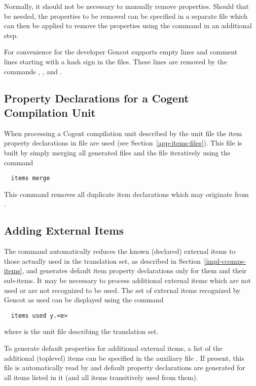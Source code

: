 Normally, it should not be necessary to manually remove properties. Should that be needed, the properties to be removed can
be specified in a separate file which can then be applied to remove the properties using the command  in 
an additional step.

For convenience for the developer Gencot supports empty lines and comment lines starting with a hash sign \code{\#} in the 
 files. These lines are removed by the commands , , and .

\subsection{Property Declarations for a Cogent Compilation Unit}
\label{app-items-unit}

When processing a Cogent compilation unit described by the unit file  the item property declarations in file
 are used (see Section~\ref{app-items-files}). This file is built by simply merging all
generated files  and the file  iteratively using the command
\begin{verbatim}
  items merge
\end{verbatim}
This command removes all duplicate item declarations which may originate from .

\subsection{Adding External Items}
\label{app-items-extern}

The command  automatically reduces the known (declared) external items to those actually used in the
translation set, as described in Section~\ref{impl-ccomps-items}, and generates default item property declarations only
for them and their sub-items. It may be necessary to process additional external items which are not used or are not recognized
to be used. The set of external items recognized by Gencot as used can be displayed using the command
\begin{verbatim}
  items used y.<e>
\end{verbatim}
where  is the unit file describing the translation set.

To generate default properties for additional external items, a list of the additional (toplevel) items can be 
specified in the auxiliary file . If present, this file is automatically read by 
and default property declarations are generated for all items listed in it (and all items transitively used from them).
